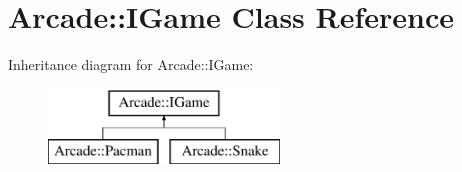 \hypertarget{class_arcade_1_1_i_game}{}\section{Arcade\+:\+:I\+Game Class Reference}
\label{class_arcade_1_1_i_game}
Inheritance diagram for Arcade\+:\+:I\+Game\+:\begin{figure}[H]
\begin{center}
\leavevmode
\includegraphics[height=2.000000cm]{class_arcade_1_1_i_game}
\end{center}
\end{figure}
